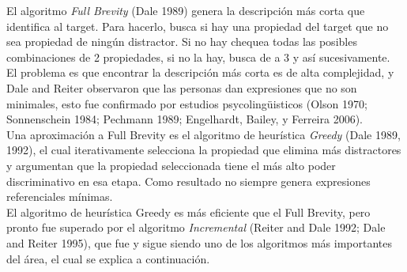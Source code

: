 
El algoritmo {\it Full Brevity} (Dale 1989) genera la descripci\'on m\'as corta que identifica al target. Para hacerlo, 
busca si hay una propiedad del target que no sea propiedad de ning\'un distractor. Si no hay chequea todas las posibles combinaciones de 2 propiedades, si no la hay, busca de a 3 y as\'i sucesivamente.\\

El problema es que encontrar la descripci\'on m\'as corta es de alta complejidad, y Dale and Reiter observaron que las personas dan expresiones que no son minimales, esto fue confirmado por estudios psycoling\"uisticos (Olson  1970;  Sonnenschein  1984; Pechmann 1989; Engelhardt, Bailey, y Ferreira 2006).\\

Una aproximaci\'on a Full Brevity es el algoritmo de heur\'istica {\it Greedy} (Dale  1989, 1992), el cual iterativamente selecciona la propiedad que elimina m\'as distractores y argumentan que la propiedad seleccionada tiene el m\'as alto poder discriminativo en esa etapa. Como resultado no siempre genera expresiones referenciales m\'inimas.\\
El algoritmo de heur\'istica Greedy es m\'as eficiente que el Full Brevity, pero pronto fue superado por el algoritmo {\it Incremental} (Reiter  and  Dale  1992;  Dale  and  Reiter  1995), que fue y sigue siendo uno de los algoritmos m\'as importantes del \'area, el cual se explica a continuaci\'on. 


